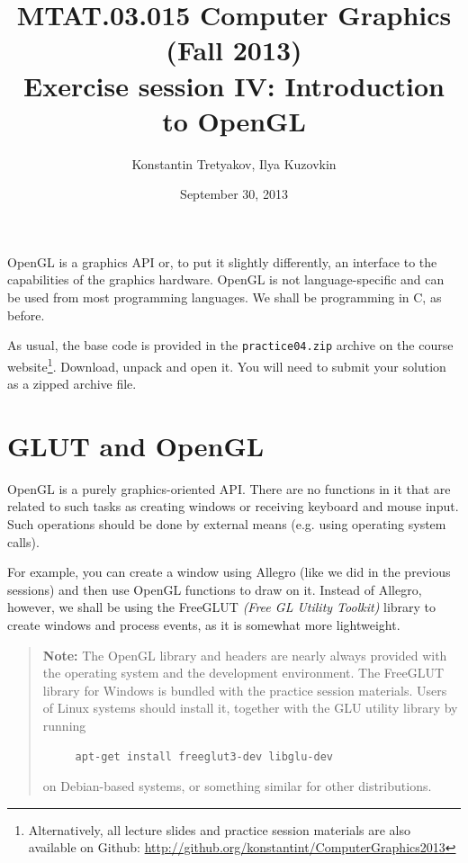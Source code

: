 \documentclass{article}
\begin{document}
\title{MTAT.03.015 Computer Graphics (Fall 2013)\\
Exercise session IV: Introduction to OpenGL}
\author{Konstantin Tretyakov, Ilya Kuzovkin}
\date{September 30, 2013}
\maketitle

OpenGL is a graphics API or, to put it slightly differently, an interface to the capabilities of the graphics hardware. OpenGL is not language-specific and can be used from most programming languages. We shall be programming in C, as before.

As usual, the base code is provided in the \texttt{practice04.zip} archive on the course website\footnote{Alternatively, all lecture slides and practice session materials are also available on Github: \url{http://github.org/konstantint/ComputerGraphics2013}}. Download, unpack and open it. You will need to submit your solution as a zipped archive file.

\section*{GLUT and OpenGL}
OpenGL is a purely graphics-oriented API. There are no functions in it that are related to such tasks as creating windows or receiving keyboard and mouse input. Such operations should be done by external means (e.g. using operating system calls).

For example, you can create a window using Allegro (like we did in the previous sessions) and then use OpenGL functions to draw on it. Instead of Allegro, however, we shall be using the FreeGLUT \emph{(Free GL Utility Toolkit)} library to create windows and process events, as it is somewhat more lightweight.

\begin{verse}
\textbf{Note:} The OpenGL library and headers are nearly always provided with the operating system and the development environment. The FreeGLUT library for Windows is bundled with the practice session materials. Users of Linux systems should install it, together with the GLU utility library by running
\begin{verbatim}
     apt-get install freeglut3-dev libglu-dev
\end{verbatim}
on Debian-based systems, or something similar for other distributions.
\end{verse}
\end{document}
